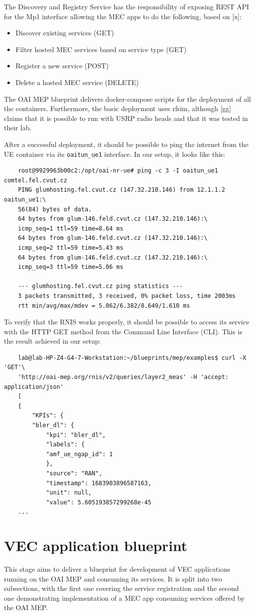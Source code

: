 \documentclass[12pt,a4paper,twoside]{report}
\begin{document}
The Discovery and Registry Service has the responsibility of exposing REST API for the Mp1 interface allowing the MEC apps to do the following, based on [x]:
\begin{itemize}
	\item Discover existing services (GET)
	\item Filter hosted MEC services based on service type (GET)
	\item Register a new service (POST)
	\item Delete a hosted MEC service (DELETE)
\end{itemize}
The OAI MEP blueprint delivers docker-compose scripts for the deployment of all the containers. Furthermore, the basic deployment uses rfsim, although [gg] claims that it is possible to run with USRP radio heads and that it was tested in their lab. 

After a successful deployment, it should be possible to ping the internet from the UE container via its \verb |oaitun_ue1| interface. In our setup, it looks like this:
\begin{verbatim}
	root@9929963b00c2:/opt/oai-nr-ue# ping -c 3 -I oaitun_ue1 comtel.fel.cvut.cz
	PING glumhosting.fel.cvut.cz (147.32.210.146) from 12.1.1.2 oaitun_ue1:\
	56(84) bytes of data.
	64 bytes from glum-146.feld.cvut.cz (147.32.210.146):\
	icmp_seq=1 ttl=59 time=8.64 ms
	64 bytes from glum-146.feld.cvut.cz (147.32.210.146):\
	icmp_seq=2 ttl=59 time=5.43 ms
	64 bytes from glum-146.feld.cvut.cz (147.32.210.146):\
	icmp_seq=3 ttl=59 time=5.06 ms

	--- glumhosting.fel.cvut.cz ping statistics ---
	3 packets transmitted, 3 received, 0% packet loss, time 2003ms
	rtt min/avg/max/mdev = 5.062/6.382/8.649/1.610 ms
\end{verbatim}

To verify that the RNIS works properly, it should be possible to access its service with the HTTP GET method from the Command Line Interface (CLI). This is the result achieved in our setup:
\begin{verbatim}
	lab@lab-HP-Z4-G4-7-Workstation:~/blueprints/mep/examples$ curl -X 'GET'\
	'http://oai-mep.org/rnis/v2/queries/layer2_meas' -H 'accept: application/json'
	[
	{
		"KPIs": {
		"bler_dl": {
			"kpi": "bler_dl",
			"labels": {
			"amf_ue_ngap_id": 1
			},
			"source": "RAN",
			"timestamp": 1683903896587163,
			"unit": null,
			"value": 5.605193857299268e-45
	...
\end{verbatim}

\section{VEC application blueprint}
This stage aims to deliver a blueprint for development of VEC applications running on the OAI MEP and consuming its services. It is split into two subsections, with the first one covering the service registration and the second one demonstrating implementation of a MEC app consuming services offered by the OAI MEP.
\end{document}
